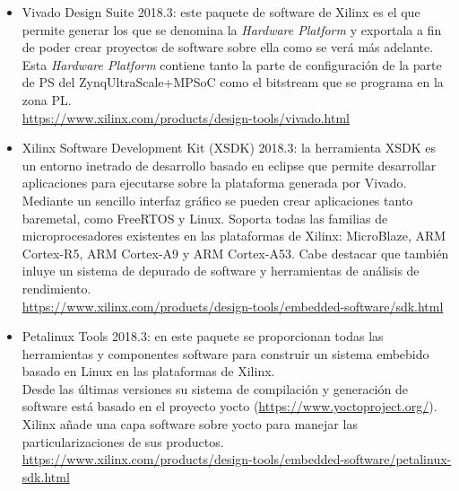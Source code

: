 \begin{itemize}
  \item Vivado Design Suite 2018.3: este paquete de software de Xilinx es el que permite generar los que se denomina la \textit{Hardware Platform} y exportala a fin de poder crear proyectos de software sobre ella como se verá más adelante. Esta \textit{Hardware Platform} contiene tanto la parte de configuración de la parte de PS del Zynq\textregistered UltraScale+\texttrademark MPSoC como el bitstream que se programa en la zona PL.\\
  \url{https://www.xilinx.com/products/design-tools/vivado.html}
  \item Xilinx Software Development Kit (XSDK) 2018.3: la herramienta \acrshort{XSDK} es un entorno inetrado de desarrollo basado en eclipse que permite desarrollar aplicaciones para ejecutarse sobre la plataforma generada por Vivado. Mediante un sencillo interfaz gráfico se pueden crear aplicaciones tanto baremetal, como FreeRTOS y Linux. Soporta todas las familias de microprocesadores existentes en las plataformas de Xilinx: MicroBlaze, ARM Cortex-R5, ARM Cortex-A9 y ARM Cortex-A53. Cabe destacar que también inluye un sistema de depurado de software y herramientas de análisis de rendimiento.\\
  \url{https://www.xilinx.com/products/design-tools/embedded-software/sdk.html}
  \item Petalinux Tools 2018.3: en este paquete se proporcionan todas las herramientas y componentes software para construir un sistema embebido basado en Linux en las plataformas de Xilinx.\\
  Desde las últimas versiones su sistema de compilación y generación de software está basado en el proyecto yocto (\url{https://www.yoctoproject.org/}). Xilinx añade una capa software sobre yocto para manejar las particularizaciones de sus productos.\\
  \url{https://www.xilinx.com/products/design-tools/embedded-software/petalinux-sdk.html}
\end{itemize}
